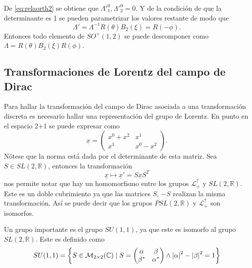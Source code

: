 De \eqref{eq:relaorth2} se obtiene que $\Lambda'^0_1,\Lambda'^0_2 = 0$. Y de la condición de que la determinante es 1 se pueden parametrizar los valores restante de modo que
\begin{equation}
	\Lambda' = \Lambda^{-1}R(\theta)B_2(\xi) = R(-\phi).
\end{equation}
Entonces todo elemento de $SO^+(1,2)$ se puede descomponer como $\Lambda = R(\theta) B_2(\xi) R(\phi)$.
\subsection{Transformaciones de Lorentz del campo de Dirac}
Para hallar la transformación del campo de Dirac asociada a una transformación discreta es necesario hallar una representación del grupo de Lorentz. En punto en el espacio 2+1 se puede expresar como
\begin{equation}
	\underline{x} = \begin{pmatrix}
		x^0+x^2 & x^1     \\
		x^1     & x^0-x^2
	\end{pmatrix}.
\end{equation}
Nótese que la norma está dada por el determinante de esta matriz.
Sea $S \in SL(2,\mathbb{R})$, entonces la transformación
\begin{equation}
	\underline{x} \longmapsto \underline{x}' = S \underline{x} S^{T}
\end{equation}
nos permite notar que hay un homomorfismo entre los grupos $\mathcal{L}_+^{\uparrow}$ y $SL(2,\mathbb{R})$. Este es un doble cubrimiento ya que las matrices $S$, $-S$ realizan la misma transformación. Así se puede decir que los grupos $PSL(2,\mathbb{R})$ y $\mathcal{L}_+^{\uparrow}$ son isomorfos.

Un grupo importante es el grupo $SU(1,1)$, ya que este es isomorfo al grupo $SL(2,\mathbb{R})$. Este es definido como
\begin{equation}
	SU(1,1) = \left\{S \in \mathcal{M}_{2 \times 2}(\mathbb{C})\mid S = \begin{pmatrix}
		\alpha       & \beta         \\
		\beta^{\ast} & \alpha^{\ast}
	\end{pmatrix}\wedge \abs{\alpha}^2 - \abs{\beta}^2 = 1\right\}
\end{equation}

